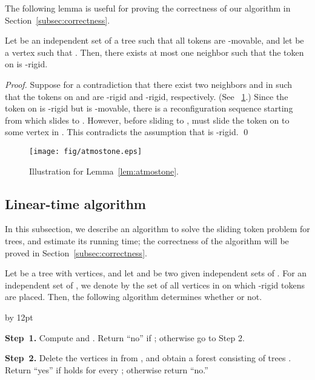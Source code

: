 \documentclass{llncs}
\newenvironment{listing}[1]{\begin{list}{*}{\settowidth{\labelwidth}{#1}\setlength{\leftmargin}{\labelwidth}\advance \leftmargin by 12pt
\setlength{\itemsep}{0pt}\setlength{\parsep}{0pt}\setlength{\topsep}{0pt}\setlength{\parskip}{0pt}}}{\end{list}}
\newcounter{one}
\newcounter{two}
\begin{document}
	The following lemma is useful for proving the correctness of our algorithm in Section~\ref{subsec:correctness}.
	\begin{lemma} \label{lem:atmostone}
	Let  be an independent set of a tree  such that all tokens are -movable, and let  be a vertex such that . 
	Then, there exists at most one neighbor  such that the token on  is -rigid. 
	\end{lemma}
	\begin{proof}
	Suppose for a contradiction that there exist two neighbors  and  in  such that the tokens on  and  are -rigid and -rigid, respectively.
(See \figurename~\ref{fig:atmostone}.)
Since the token  on  is -rigid but is -movable, there is a reconfiguration sequence  starting from  which slides  to . 
	However, before sliding  to ,  must slide the token  on  to some vertex in . 
	This contradicts the assumption that  is -rigid.
	\qed
	\end{proof}
\begin{figure}[t]
\begin{center}
	\texttt{[image: fig/atmostone.eps]}
	\end{center}
	\vspace{-1em}
	\caption{Illustration for Lemma~\ref{lem:atmostone}.}
	\label{fig:atmostone}
\end{figure}

	
	\subsection{Linear-time algorithm}
	\label{subsec:algorithm}
	
	In this subsection, we describe an algorithm to solve the {\sc sliding token} problem for trees, and estimate its running time;
the correctness of the algorithm will be proved in Section~\ref{subsec:correctness}. 
\smallskip

	Let  be a tree with  vertices, and let  and  be two given independent sets of . 
	For an independent set  of , we denote by  the set of all vertices in  on which -rigid tokens are placed. 
	Then, the following algorithm determines whether  or not.
\smallskip

	\begin{listing}{{\bf Step~2.}}
	\item[{\bf Step~1.}] Compute  and .
								Return ``no'' if ; otherwise go to Step 2.
\smallskip

	\item[{\bf Step~2.}] Delete the vertices in  from , and obtain a forest  consisting of  trees . 
								Return ``yes'' if  holds for every ; otherwise return ``no.''
	\end{listing}
\smallskip
\end{document}
